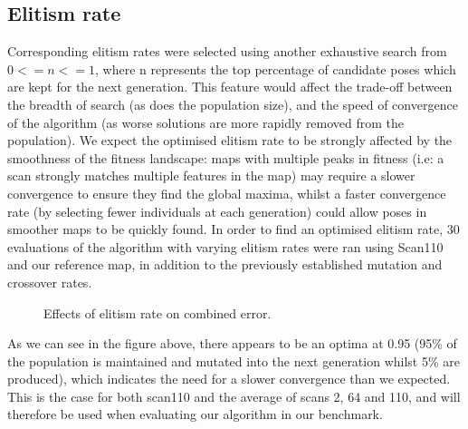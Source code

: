 \documentclass[authoryearcitations]{UoYCSproject}
\begin{document}
\subsection{Elitism rate}
\label{subsec:elite_elitism_rate}
Corresponding elitism rates were selected using another exhaustive search from $0 <= n <= 1$, where n represents the top percentage of candidate poses which are kept for the next generation. This feature would affect the trade-off between the breadth of search (as does the population size), and the speed of convergence of the algorithm (as worse solutions are more rapidly removed from the population). We expect the optimised elitism rate to be strongly affected by the smoothness of the fitness landscape: maps with multiple peaks in fitness (i.e: a scan strongly matches multiple features in the map) may require a slower convergence to ensure they find the global maxima, whilst a faster convergence rate (by selecting fewer individuals at each generation) could allow poses in smoother maps to be quickly found. In order to find an optimised elitism rate, 30 evaluations of the algorithm with varying elitism rates were ran using Scan110 and our reference map, in addition to the previously established mutation and crossover rates.

\begin{figure}
	\centering
	\caption[Optimising elitism rate for scan/map]{Effects of elitism rate on combined error.}
	\label{fig:elitsm_rates}
\end{figure}
As we can see in the figure above, there appears to be an optima at 0.95 (95\% of the population is maintained and mutated into the next generation whilst 5\% are produced), which indicates the need for a slower convergence than we expected. This is the case for both scan110 and the average of scans 2, 64 and 110, and will therefore be used when evaluating our algorithm in our benchmark.
\end{document}
